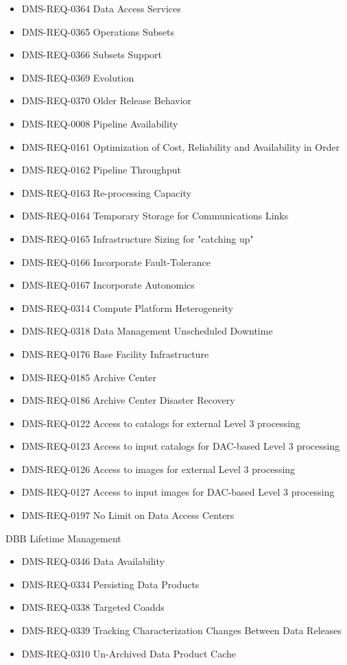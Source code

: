 \begin{itemize}
\item DMS-REQ-0364 Data Access Services
\item DMS-REQ-0365 Operations Subsets
\item DMS-REQ-0366 Subsets Support
\item DMS-REQ-0369 Evolution
\item DMS-REQ-0370 Older Release Behavior
\item DMS-REQ-0008 Pipeline Availability
\item DMS-REQ-0161 Optimization of Cost, Reliability and Availability in Order
\item DMS-REQ-0162 Pipeline Throughput
\item DMS-REQ-0163 Re-processing Capacity
\item DMS-REQ-0164 Temporary Storage for Communications Links
\item DMS-REQ-0165 Infrastructure Sizing for "catching up"
\item DMS-REQ-0166 Incorporate Fault-Tolerance
\item DMS-REQ-0167 Incorporate Autonomics
\item DMS-REQ-0314 Compute Platform Heterogeneity
\item DMS-REQ-0318 Data Management Unscheduled Downtime
\item DMS-REQ-0176 Base Facility Infrastructure
\item DMS-REQ-0185 Archive Center
\item DMS-REQ-0186 Archive Center Disaster Recovery
\item DMS-REQ-0122 Access to catalogs for external Level 3 processing
\item DMS-REQ-0123 Access to input catalogs for DAC-based Level 3 processing
\item DMS-REQ-0126 Access to images for external Level 3 processing
\item DMS-REQ-0127 Access to input images for DAC-based Level 3 processing
\item DMS-REQ-0197 No Limit on Data Access Centers
\end{itemize}
DBB Lifetime Management \begin{itemize}
\item DMS-REQ-0346 Data Availability
\item DMS-REQ-0334 Persisting Data Products
\item DMS-REQ-0338 Targeted Coadds
\item DMS-REQ-0339 Tracking Characterization Changes Between Data Releases
\item DMS-REQ-0310 Un-Archived Data Product Cache
\end{itemize}

